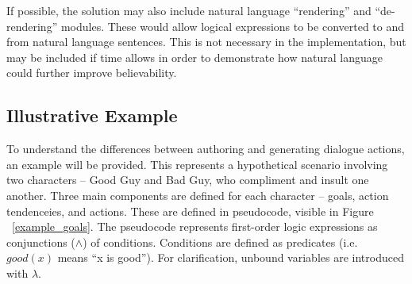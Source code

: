 \documentclass{article}
\begin{document}
If possible, the solution may also include natural language
``rendering'' and ``de-rendering'' modules.  These would allow logical
expressions to be converted to and from natural language sentences.
This is not necessary in the implementation, but may be included if
time allows in order to demonstrate how natural language could further
improve believability.

\subsection{Illustrative Example}

To understand the differences between authoring and generating
dialogue actions, an example will be provided.  This represents a
hypothetical scenario involving two characters -- Good Guy and Bad
Guy, who compliment and insult one another.  Three main components are
defined for each character -- goals, action tendenceies, and
actions.  These are defined in pseudocode, visible in Figure
~\ref{example_goals}.  The pseudocode represents first-order logic
expressions as conjunctions ($\wedge$) of conditions.  Conditions
are defined as predicates (i.e. $good(x)$ means ``x is good'').
For clarification, unbound variables are introduced with $\lambda$.
\end{document}
